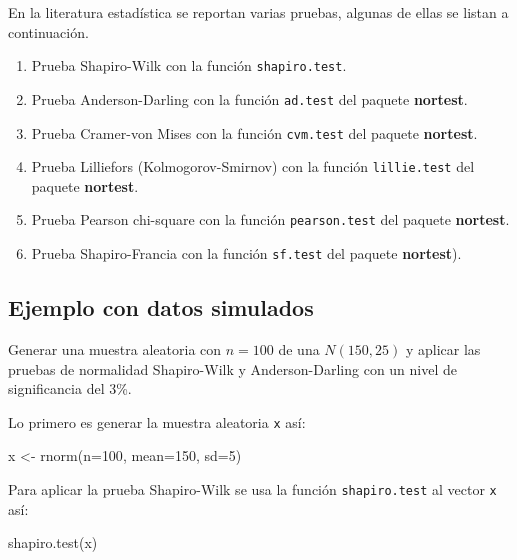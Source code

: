 \documentclass[
]{book}
\makeatletter
\newenvironment{Shaded}{\begin{snugshade}}{\end{snugshade}}
\newcommand{\AttributeTok}[1]{\textcolor[rgb]{0.77,0.63,0.00}{#1}}
\newcommand{\DecValTok}[1]{\textcolor[rgb]{0.00,0.00,0.81}{#1}}
\newcommand{\FunctionTok}[1]{\textcolor[rgb]{0.00,0.00,0.00}{#1}}
\newcommand{\NormalTok}[1]{#1}
\newcommand{\OtherTok}[1]{\textcolor[rgb]{0.56,0.35,0.01}{#1}}
\providecommand{\tightlist}{%
  \setlength{\itemsep}{0pt}\setlength{\parskip}{0pt}}
\newenvironment{kframe}{%
\medskip{}
\setlength{\fboxsep}{.8em}
 \def\at@end@of@kframe{}%
 \ifinner\ifhmode%
  \def\at@end@of@kframe{\end{minipage}}%
  \begin{minipage}{\columnwidth}%
 \fi\fi%
 \def\FrameCommand##1{\hskip\@totalleftmargin \hskip-\fboxsep
 \colorbox{shadecolor}{##1}\hskip-\fboxsep
     \hskip-\linewidth \hskip-\@totalleftmargin \hskip\columnwidth}%
 \MakeFramed {\advance\hsize-\width
   \@totalleftmargin\z@ \linewidth\hsize
   \@setminipage}}%
 {\par\unskip\endMakeFramed%
 \at@end@of@kframe}
\renewenvironment{Shaded}{\begin{kframe}}{\end{kframe}}
\makeatother
\begin{document}
En la literatura estadística se reportan varias pruebas, algunas de ellas se listan a continuación.

\begin{enumerate}
\def\labelenumi{\arabic{enumi}.}
\tightlist
\item
  Prueba Shapiro-Wilk con la función \texttt{shapiro.test}.
\item
  Prueba Anderson-Darling con la función \texttt{ad.test} del paquete \textbf{nortest}.
\item
  Prueba Cramer-von Mises con la función \texttt{cvm.test} del paquete \textbf{nortest}.
\item
  Prueba Lilliefors (Kolmogorov-Smirnov) con la función \texttt{lillie.test} del paquete \textbf{nortest}.
\item
  Prueba Pearson chi-square con la función \texttt{pearson.test} del paquete \textbf{nortest}.
\item
  Prueba Shapiro-Francia con la función \texttt{sf.test} del paquete \textbf{nortest}).
\end{enumerate}

\hypertarget{ejemplo-con-datos-simulados}{%
\subsection*{Ejemplo con datos simulados}\label{ejemplo-con-datos-simulados}}

Generar una muestra aleatoria con \(n=100\) de una \(N(150, 25)\) y aplicar las pruebas de normalidad Shapiro-Wilk y Anderson-Darling con un nivel de significancia del 3\%.

Lo primero es generar la muestra aleatoria \texttt{x} así:

\begin{Shaded}
\begin{Highlighting}[]
\NormalTok{x }\OtherTok{\textless{}{-}} \FunctionTok{rnorm}\NormalTok{(}\AttributeTok{n=}\DecValTok{100}\NormalTok{, }\AttributeTok{mean=}\DecValTok{150}\NormalTok{, }\AttributeTok{sd=}\DecValTok{5}\NormalTok{)}
\end{Highlighting}
\end{Shaded}

Para aplicar la prueba Shapiro-Wilk se usa la función \texttt{shapiro.test} al vector \texttt{x} así:

\begin{Shaded}
\begin{Highlighting}[]
\FunctionTok{shapiro.test}\NormalTok{(x)}
\end{Highlighting}
\end{Shaded}
\end{document}
